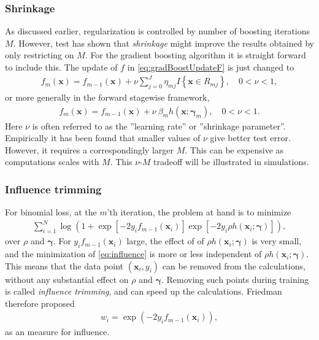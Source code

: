 \subsubsection{Shrinkage}
\label{sub:Shrinkage}
As discussed earlier, regularization is controlled by number of boosting iterations $M$. However, test has shown  \cite{copas1983} that \textit{shrinkage} might improve the results obtained by only restricting on $M$. For the gradient boosting algorithm it is straight forward to include this. 
The update of $f$ in \eqref{eq:gradBoostUpdateF} is just changed to
\begin{align}
  f_m(\mathbf{x}) = f_{m-1}(\mathbf{x}) +  \nu \sum^{J}_{j=0} \eta_{m j} I\left\{ \mathbf{x} \in R_{m j} \right\}, \quad 0 < \nu < 1,
\end{align}
or more generally in the forward stagewise framework,
\begin{align}
  f_m(\mathbf{x}) = f_{m-1}(\mathbf{x}) +  \nu \: \beta_m h(\mathbf{x}; \bm \gamma_m), \quad 0 < \nu < 1.
\end{align}
Here $\nu$ is often referred to as the ''learning rate'' or ''shrinkage parameter''. Empirically it has been found \cite{friedman} that smaller values of $\nu$ give better test error. However, it requires a correspondingly larger $M$. This can be expensive as computations scales with $M$. This $\nu$-$M$ tradeoff will be illustrated in simulations.


\subsubsection{Influence trimming}
\label{sub:Influence trimming}
For binomial loss, at the $m$'th iteration, the problem at hand is to minimize
\begin{align}
  \label{eq:influence} 
  \sum_{i = 1}^{N} \log \left( 1 + \exp[ -2 y_i f_{m-1}(\mathbf{x}_i)] \exp [-2 y_i \rho h(\mathbf{x}_i; \bm \gamma)] \right),
\end{align}
over $\rho$ and $\bm \gamma$.  For $y_i f_{m-1}(\mathbf{x}_i)$ large, the effect of of $\rho h(\mathbf{x}_i; \bm{\gamma})$ is very small, and the minimization of \eqref{eq:influence} is more or less independent of $\rho h(\mathbf{x}_i; \bm \gamma)$. This means that the data point $(\mathbf{x}_i, y_i)$ can be removed from the calculations, without any substantial effect on $\rho$ and $\bm \gamma$. Removing such points during training is called \textit{influence trimming}, and can speed up the calculations. Friedman therefore proposed 
\begin{align}
  w_i = \exp (- 2 y_i f_{m-1}(\mathbf{x}_i)), 
\end{align}
as an measure for influence. 

